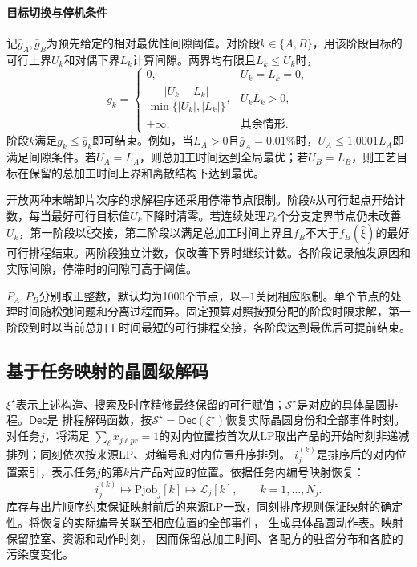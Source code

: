 \documentclass[final,5p,times,twocolumn]{elsarticle}
\begin{document}
\paragraph{目标切换与停机条件}
记$\bar g_A,\bar g_B$为预先给定的相对最优性间隙阈值。对阶段$k\in\{A,B\}$，用该阶段目标的可行上界$U_k$和对偶下界$L_k$计算间隙。两界均有限且$L_k\le U_k$时，
\begin{equation}
g_k=
\begin{cases}
0, & U_k=L_k=0,\\[2pt]
\dfrac{|U_k-L_k|}{\min\{|U_k|,|L_k|\}}, & U_kL_k>0,\\[5pt]
+\infty, & \text{其余情形}.
\end{cases}
\label{eq:stage-relative-gap-cn}
\end{equation}
阶段$k$满足$g_k\le\bar g_k$即可结束。例如，当$L_A>0$且$\bar g_A=0.01\%$时，$U_A\le1.0001L_A$即满足间隙条件。若$U_A=L_A$，则总加工时间达到全局最优；若$U_B=L_B$，则工艺目标在保留的总加工时间上界和离散结构下达到最优。

开放两种末端卸片次序的求解程序还采用停滞节点限制。阶段$k$从可行起点开始计数，每当最好可行目标值$U_k$下降时清零。若连续处理$P_k$个分支定界节点仍未改善$U_k$，第一阶段以$\widehat\xi$交接，第二阶段以满足总加工时间上界且$f_B$不大于$f_B(\widehat\xi)$的最好可行排程结束。两阶段独立计数，仅改善下界时继续计数。各阶段记录触发原因和实际间隙，停滞时的间隙可高于阈值。

$P_A,P_B$分别取正整数，默认均为1000个节点，以$-1$关闭相应限制。单个节点的处理时间随松弛问题和分离过程而异。固定预算对照按预分配的阶段时限求解，第一阶段到时以当前总加工时间最短的可行排程交接，各阶段达到最优后可提前结束。

\subsection{基于任务映射的晶圆级解码}
\label{sec:pjob-decoding-cn}

$\xi^\star$表示上述构造、搜索及时序精修最终保留的可行赋值；$\mathcal S^\star$是对应的具体晶圆排程。$\mathsf{Dec}$是
排程解码函数，按$\mathcal S^\star=\mathsf{Dec}(\xi^\star)$恢复实际晶圆身份和全部事件时刻。对任务$j$，将满足
$\sum_\ell x_{j\ell pr}=1$的对内位置按首次从LP取出产品的开始时刻非递减排列；同刻依次按来源LP、对编号和对内位置升序排列。
$i_j^{(k)}$是排序后的对内位置索引，表示任务$j$的第$k$片产品对应的位置。依据任务内编号映射恢复：
\begin{equation}
i_j^{(k)}\longmapsto\mathrm{Pjob}_j[k]
\longmapsto\mathcal L_j[k],\qquad k=1,\ldots,N_j.
\label{eq:pjob-decoding-cn}
\end{equation}
库存与出片顺序约束保证映射前后的来源LP一致，同刻排序规则保证映射的确定性。将恢复的实际编号关联至相应位置的全部事件，
生成具体晶圆动作表。映射保留腔室、资源和动作时刻，
因而保留总加工时间、各配方的驻留分布和各腔的污染度变化。
\end{document}
